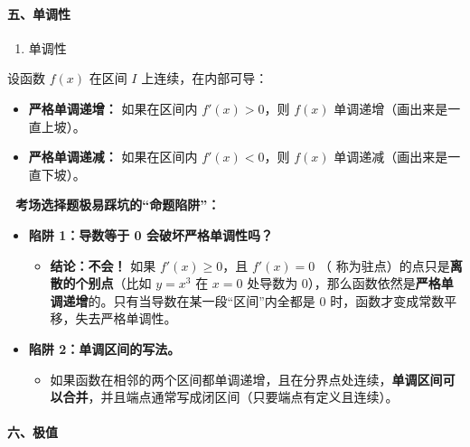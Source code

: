 \documentclass[
]{article}
\begin{document}
\paragraph{五、单调性}\label{ux4e94ux5355ux8c03ux6027}

\begin{enumerate}
\def\labelenumi{\arabic{enumi}.}
\item
  单调性
\end{enumerate}

设函数 \(f(x)\) 在区间 \(I\) 上连续，在内部可导：

\begin{itemize}
\item
  \textbf{严格单调递增：} 如果在区间内 \(f'(x) > 0\)，则 \(f(x)\)
  单调递增（画出来是一直上坡）。
\item
  \textbf{严格单调递减：} 如果在区间内 \(f'(x) < 0\)，则 \(f(x)\)
  单调递减（画出来是一直下坡）。
\end{itemize}

\textbf{🚨 考场选择题极易踩坑的``命题陷阱''：}

\begin{itemize}
\item
  \textbf{陷阱 1：导数等于 0 会破坏严格单调性吗？}

  \begin{itemize}
  \item
    \textbf{结论：不会！} 如果 \(f'(x) \ge 0\)，且 \(f'(x) = 0\) （
    称为驻点）的点只是\textbf{离散的个别点}（比如 \(y = x^3\) 在 \(x=0\)
    处导数为
    0），那么函数依然是\textbf{严格单调递增}的。只有当导数在某一段``区间''内全都是
    0 时，函数才变成常数平移，失去严格单调性。
  \end{itemize}
\item
  \textbf{陷阱 2：单调区间的写法。}

  \begin{itemize}
  \item
    如果函数在相邻的两个区间都单调递增，且在分界点处连续，\textbf{单调区间可以合并}，并且端点通常写成闭区间（只要端点有定义且连续）。
  \end{itemize}
\end{itemize}

\paragraph{六、极值}\label{ux516dux6781ux503c}
\end{document}
